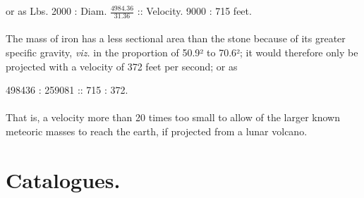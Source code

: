 \documentclass[a4paper, 12pt, oneside]{article}
\begin{document}
\begin{center}
\normalsize
or as Lbs. 2000 : Diam. $\frac{4984.36}{31.36}$ :: Velocity. 9000 : 715 feet.
\end{center}
\paragraph{}
The mass of iron has a less sectional area than the stone because of its greater specific gravity, \emph{viz.} in the proportion of 50.9² to 70.6²; it would therefore only be projected with a velocity of 372 feet per second; or as
\begin{center}
\normalsize
498436 : 259081 :: 715 : 372.
\end{center}
\paragraph{}
That is, a velocity more than 20 times too small to allow of the larger known meteoric masses to reach the earth, if projected from a lunar volcano.
\clearpage
\section{Catalogues.}
\end{document}
